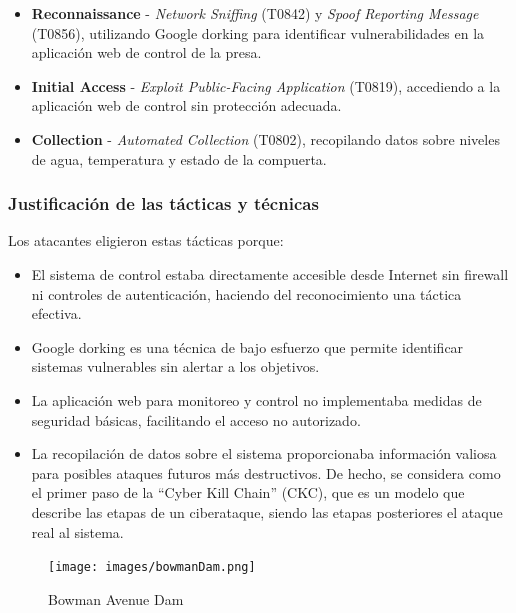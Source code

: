 \begin{itemize}
    \item \textbf{Reconnaissance} - \textit{Network Sniffing} (T0842) y \textit{Spoof Reporting Message} (T0856), utilizando Google dorking para identificar vulnerabilidades en la aplicación web de control de la presa.
    
    \item \textbf{Initial Access} - \textit{Exploit Public-Facing Application} (T0819), accediendo a la aplicación web de control sin protección adecuada.
    
    \item \textbf{Collection} - \textit{Automated Collection} (T0802), recopilando datos sobre niveles de agua, temperatura y estado de la compuerta.
\end{itemize}

\subsubsection{Justificación de las tácticas y técnicas}
Los atacantes eligieron estas tácticas porque:

\begin{itemize}
    \item El sistema de control estaba directamente accesible desde Internet sin firewall ni controles de autenticación, haciendo del reconocimiento una táctica efectiva.
        
        \item Google dorking es una técnica de bajo esfuerzo que permite identificar sistemas vulnerables sin alertar a los objetivos.
        
        \item La aplicación web para monitoreo y control no implementaba medidas de seguridad básicas, facilitando el acceso no autorizado.
        
        \item La recopilación de datos sobre el sistema proporcionaba información valiosa para posibles ataques futuros más destructivos.
        De hecho, se considera como el primer paso de la ``Cyber Kill Chain'' (CKC), que es un modelo que describe las etapas de un ciberataque, siendo las etapas posteriores el ataque real al sistema.
\end{itemize}

\newpage

\begin{figure}[htbp]
    \centering
    \texttt{[image: images/bowmanDam.png]}
    \caption{Bowman Avenue Dam}
    \label{fig:bowmanDam}
\end{figure}

